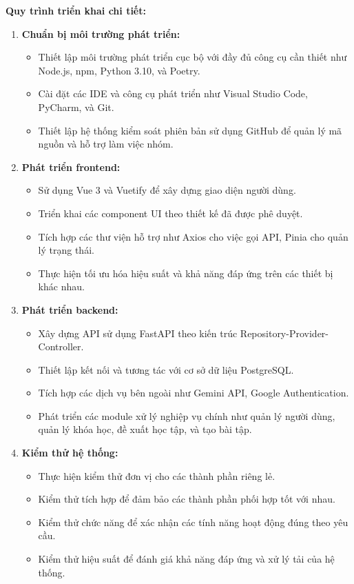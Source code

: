 \textbf{Quy trình triển khai chi tiết:}
\begin{enumerate}
\item \textbf{Chuẩn bị môi trường phát triển:}
\begin{itemize}
\item Thiết lập môi trường phát triển cục bộ với đầy đủ công cụ cần thiết như Node.js, npm, Python 3.10, và Poetry.
\item Cài đặt các IDE và công cụ phát triển như Visual Studio Code, PyCharm, và Git.
\item Thiết lập hệ thống kiểm soát phiên bản sử dụng GitHub để quản lý mã nguồn và hỗ trợ làm việc nhóm.
\end{itemize}
\item \textbf{Phát triển frontend:}
\begin{itemize}
    \item Sử dụng Vue 3 và Vuetify để xây dựng giao diện người dùng.
    \item Triển khai các component UI theo thiết kế đã được phê duyệt.
    \item Tích hợp các thư viện hỗ trợ như Axios cho việc gọi API, Pinia cho quản lý trạng thái.
    \item Thực hiện tối ưu hóa hiệu suất và khả năng đáp ứng trên các thiết bị khác nhau.
\end{itemize}

\item \textbf{Phát triển backend:}
\begin{itemize}
    \item Xây dựng API sử dụng FastAPI theo kiến trúc Repository-Provider-Controller.
    \item Thiết lập kết nối và tương tác với cơ sở dữ liệu PostgreSQL.
    \item Tích hợp các dịch vụ bên ngoài như Gemini API, Google Authentication.
    \item Phát triển các module xử lý nghiệp vụ chính như quản lý người dùng, quản lý khóa học, đề xuất học tập, và tạo bài tập.
\end{itemize}

\item \textbf{Kiểm thử hệ thống:}
\begin{itemize}
    \item Thực hiện kiểm thử đơn vị cho các thành phần riêng lẻ.
    \item Kiểm thử tích hợp để đảm bảo các thành phần phối hợp tốt với nhau.
    \item Kiểm thử chức năng để xác nhận các tính năng hoạt động đúng theo yêu cầu.
    \item Kiểm thử hiệu suất để đánh giá khả năng đáp ứng và xử lý tải của hệ thống.
\end{itemize}


\end{enumerate}
